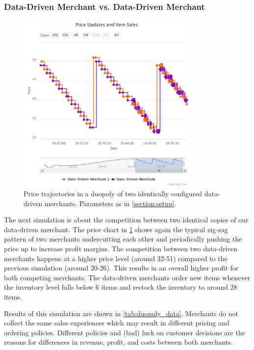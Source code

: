 \subsubsection{Data-Driven Merchant vs. Data-Driven Merchant}

\begin{figure}[t]
	\centering
	\includegraphics[width=0.8\textwidth]{figures/duopoly_data_prices}
	\caption[Price Trajectories: Data-Driven Merchant versus Data-Driven Merchant]{Price trajectories in a duopoly of two identically configured data-driven merchants. Parameters as in \cref{section:setup}.}
	\label{fig:duopoly_data_prices}
\end{figure}

The next simulation is about the competition between two identical copies of our data-driven merchant.
The price chart in \cref{fig:duopoly_data_prices} shows again the typical zig-zag pattern of two merchants undercutting each other and periodically pushing the price up to increase profit margins.
The competition between two data-driven merchants happens at a higher price level (around 32-51) compared to the previous simulation (around 20-26).
This results in an overall higher profit for both competing merchants.
The data-driven merchants order new items whenever the inventory level falls below 6 items and restock the inventory to around 28 items.

Results of this simulation are shown in \cref{tab:duopoly_data}.
Merchants do not collect the same sales experiences which may result in different pricing and ordering policies.
Different policies and (bad) luck on customer decisions are the reasons for differences in revenue, profit, and costs between both merchants.

